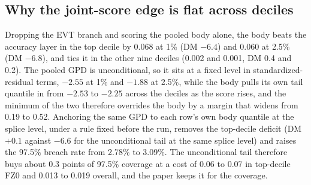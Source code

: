 \documentclass[11pt]{article}
\begin{document}
\subsection*{Why the joint-score edge is flat across deciles}
Dropping the EVT branch and scoring the pooled body alone, the body beats the accuracy layer in the top decile by 0.068 at 1\% (DM $-6.4$) and 0.060 at 2.5\% (DM $-6.8$), and ties it in the other nine deciles (0.002 and 0.001, DM 0.4 and 0.2). The pooled GPD is unconditional, so it sits at a fixed level in standardized-residual terms, $-2.55$ at 1\% and $-1.88$ at 2.5\%, while the body pulls its own tail quantile in from $-2.53$ to $-2.25$ across the deciles as the score rises, and the minimum of the two therefore overrides the body by a margin that widens from 0.19 to 0.52. Anchoring the same GPD to each row's own body quantile at the splice level, under a rule fixed before the run, removes the top-decile deficit (DM $+0.1$ against $-6.6$ for the unconditional tail at the same splice level) and raises the 97.5\% breach rate from 2.78\% to 3.09\%. The unconditional tail therefore buys about 0.3 points of 97.5\% coverage at a cost of 0.06 to 0.07 in top-decile FZ0 and 0.013 to 0.019 overall, and the paper keeps it for the coverage.
\end{document}
